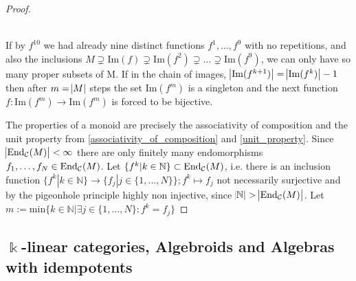 \begin{proof}[Proof\nopunct]
\begin{subproof}[Proof of (4).]
\\

If by $f^{10}$ we had already nine distinct functions $f^{1},\dots,f^{9}$ with no repetitions, and also the inclusions
$M \supsetneq \mathrm{Im}(f) \supsetneq \mathrm{Im}(f^{2}) \supsetneq \dots \supsetneq \mathrm{Im}(f^{9})$, we can only have
so many proper subsets of M. If in the chain of images, $\abs{\mathrm{Im}(f^{k+1})} = \abs{\mathrm{Im}(f^{k})} - 1$ then after
$m = \abs{M}$ steps the set $\mathrm{Im}(f^{m})$ is a singleton and the next function $f : \mathrm{Im}(f^{m}) \rightarrow \mathrm{Im}(f^{m})$
is forced to be bijective.
\end{subproof}

The properties of a monoid are precisely the associativity of composition and the unit property from \ref{associativity_of_composition} and
\ref{unit_property}.
Since $\abs{\textup{End}_{\mathcal{C}}(M)}<\infty$ there are only finitely many endomorphisms
$f_{1},\dots, f_{N} \in \textup{End}_{\mathcal{C}}(M)$.
Let $\{f^{k} | k \in \mathbb{N} \} \subset \textup{End}_{\mathcal{C}}(M)$, i.e. there is an inclusion function 
$\{f^{k} | k \in \mathbb{N}\} \rightarrow \{f_{j} | j \in \{1,\dots,N\}\}; f^{k} \mapsto f_{j}$ not necessarily surjective and 
by the pigeonhole principle highly non injective, since $\abs{\mathbb{N}}>\abs{\textup{End}_{\mathcal{C}}(M)}$.
Let $m := \mathrm{min} \{ k \in \mathbb{N}| \exists j \in \{ 1,\dots,N\} : f^{k} =  f_{j} \}$
\end{proof}


\begin{example}

\end{example}


\subsection{$\Bbbk$-linear categories, Algebroids and Algebras with idempotents}




